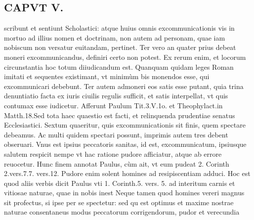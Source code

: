 \documentclass{article}
\begin{document}
\begin{pages}
\section*{CAPVT  V. }
\marginpar{[ p.399 ]}\pstart scribunt et sentiunt Scholastici: atque huius omnis excommunicationis vis in mortuo ad illius nomen et doctrinam, non autem ad personam, quae iam nobiscum non versatur euitandam, pertinet.  \pend\pstart Ter vero an quater prius debeat moneri excommunicandus, definiri certo non potest. Ex rerum enim, et locorum circunstantia hoc totum diiudicandum est. Quanquam quidam leges Roman imitati et sequentes existimant, vt minimùm bis monendos esse, qui excommunicari debebunt. Ter autem admoneri eos satis esse putant, quia trina denuntiatio facta ex iuris ciuilis regulis sufficit, et satis interpellat, vt quis contumax esse iudicetur. Afferunt Paulum Tit.3.V.1o. et Theophylact.in Matth.18.Sed tota haec quaestio est facti, et relinquenda prudentiae senatus Ecclesiastici.  \pend\pstart Sextum quaeritur, quis excommunicationis sit finis, quem spectare debeamus. Ac multi quidem spectari possunt, imprimis autem tres debent obseruari. Vnus est ipsius peccatoris sanitas, id est, excommunicatum, ipsiusque salutem respicit nempe vt hac ratione pudore afficiatur, atque  ab errore reuocetur. Hunc finem annotat Paulus, cùm ait, vt eum pudeat 2. Corinth 2.vers.7.7. vers.12. Pudore enim solent homines ad resipiscentiam adduci. Hoc est quod aliis verbis dicit Paulus vti 1. Corinth.5. vers. 5. ad interitum carnis et vitiosae naturae, quae in nobis inest Neque tamen quod homines vereri magnus sit profectus, si ipse per se spectetur: sed qu est optimus et maxime nostrae naturae consentaneus modus peccatorum corrigendorum, pudor et verecundia  \pend

\end{pages}
\end{document}
